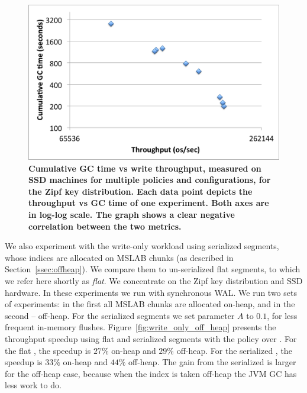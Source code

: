 \begin{figure}[htb]
\includegraphics[width=\figw]{Figs/gc-throughput-log2.png}
\caption{\textbf{Cumulative GC time vs write throughput, measured on SSD machines 
for multiple \sys\/ policies and configurations, for the Zipf  key distribution. Each data point 
depicts the throughput vs GC time of one experiment. Both axes are in log-log scale.  
The graph shows a clear negative correlation between the two metrics. 
}}
\label{fig:gc-throughput-log2}
\end{figure}

We also experiment with the write-only workload using serialized segments, whose indices are allocated on  MSLAB chunks
(as described in Section~\ref{ssec:offheap}). We compare them to un-serialized flat segments, to which we refer here 
shortly as \emph{flat}.
We concentrate on the Zipf key distribution and  SSD hardware. In these experiments we run with synchronous WAL.
We run two sets of experiments: in the first  all MSLAB chunks are allocated on-heap, and in the second --  off-heap. For the serialized segments we set parameter $A$ to $0.1$, for less frequent in-memory flushes. Figure~\ref{fig:write_only_off_heap} presents the throughput speedup using flat and serialized 
segments with the \basic\/ policy over \none. For the flat \basic, the speedup is $27\%$ on-heap and $29\%$ off-heap. For the serialized \basic, the speedup is $33\%$ on-heap and $44\%$ off-heap. The gain from the serialized \basic\/ is larger for the off-heap case, because when 
the index is taken off-heap the JVM GC has less work to do. 

